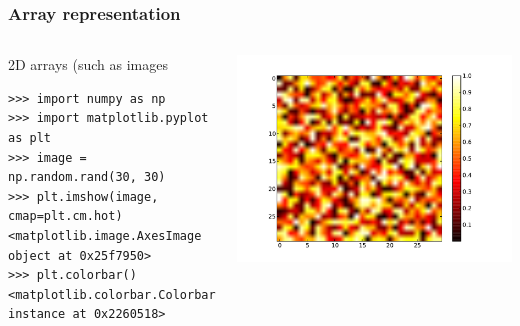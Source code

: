 \documentclass[colorlinks]{beamer}
\begin{document}
\begin{frame}[fragile]\frametitle{Array representation}
\begin{columns}[c]
\begin{block}{2D arrays (such as images}
\tiny
\begin{verbatim}
>>> import numpy as np
>>> import matplotlib.pyplot as plt
>>> image = np.random.rand(30, 30)
>>> plt.imshow(image, cmap=plt.cm.hot)    
<matplotlib.image.AxesImage object at 0x25f7950>
>>> plt.colorbar()    
<matplotlib.colorbar.Colorbar instance at 0x2260518>
\end{verbatim}

\end{block}


\includegraphics[width=\textwidth]{plwfigis/CursP_2_figure4}

     
\end{columns}
\end{frame}
\end{document}
